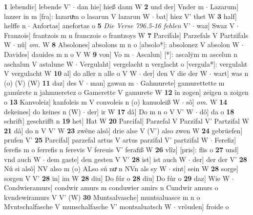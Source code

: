 \documentclass[8pt,a4paper,notitlepage]{article}
\begin{document}
\begin{table}[ht]
\begin{minipage}[t]{0.5\linewidth}
\textbf{1} lebendic] lebende V'  $\cdot$ dan hie] hieß dann W \textbf{2} und der] Vnder m  $\cdot$ Lazarum] lazzer in m [fra]: lazaruͯm o lasarun V lazarun W  $\cdot$ bat] hiez V' thet W \textbf{3} half] helffe n  $\cdot$ Anfortas] anefortas o \textbf{5} \textit{Die Verse 796.5-16 fehlen} V'   $\cdot$ waz] Swaz V  $\cdot$ Franzois] frantzois m n franczois o frantzoys W \textbf{7} Parcifals] Parzefals V Partzifals W  $\cdot$ nû] \textit{om.} W \textbf{8} Absolones] absolons m n o [absolo*]: absolonez V absolon W  $\cdot$ Davides] dauides m n o V W \textbf{9} von] Vo m  $\cdot$ Ascalun] [*]: ascalẏm m ascelun n aschalun V astalune W  $\cdot$ Vergulaht] vergelacht n verglacht o [vergula*]: vergulaht V vergulacht W \textbf{10} al] do aller n alle o V W  $\cdot$ der] den V die der W  $\cdot$ wart] was n (o) (V) (W) \textbf{11} daz] des V  $\cdot$ man] gawan m  $\cdot$ Gahmurete] gamurettette m gamúrete n jahmueretez o Gamerette V gamurete W \textbf{12} în zogen] zeigen n zoigen o \textbf{13} Kanvoleiz] kanfoleis m V convoleis n (o) kanuoleiß W  $\cdot$ sô] \textit{om.} W \textbf{14} dekeines] do keines n (W)  $\cdot$ der] ir W \textbf{17} dâ] Do m n o V V' W  $\cdot$ dô] da o \textbf{18} schrift] geschrifft n \textbf{19} het] Hat W \textbf{20} Parcifal] Parzefal V Parzifal V' Partzifal W \textbf{21} dâ] do n V V' W \textbf{23} zwêne alsô] drie alse V (V') also zwen W \textbf{24} gebrüefen] prufen V' \textbf{25} Parcifal] parzefal artus V artus parzifal V' partzifal W  $\cdot$ Ferefiz] ferefis m o ferrefis n ferevis V fereuis V' ferafiß W \textbf{26} vlîz] [pris]: flis o \textbf{27} und] vnd auch W  $\cdot$ dem gaste] den gesten V V' \textbf{28} ist] ist auch W  $\cdot$ der] der der V' \textbf{28} Nû si alsô] NV also m (o) ALso sú nuͯ n NVn als sy W  $\cdot$ sint] sein W \textbf{28} sorge] sorgen V V' \textbf{28} in] im W \textbf{28} diu] Do fúr o \textbf{28} diu] Do fúr o \textbf{29} daz] Wie W  $\cdot$ Condwieramurs] condwir amurs m conduwier amirs n Cundwir amurs o kvndewiramurs V V' (W) \textbf{30} Muntsalvasche] muntsaluasce m n o Mvntschalfasche V munschalfasche V' montsaluatsch W  $\cdot$ vröuden] froide o \newline
\end{minipage}
\end{table}
\newpage
\end{document}
